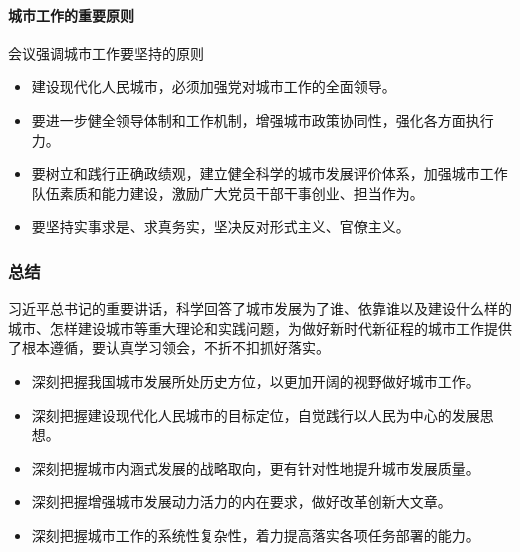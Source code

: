 \paragraph{城市工作的重要原则} 会议强调城市工作要坚持的原则

\begin{itemize}
    \item 建设现代化人民城市，必须加强党对城市工作的全面领导。
    \item 要进一步健全领导体制和工作机制，增强城市政策协同性，强化各方面执行力。
    \item 要树立和践行正确政绩观，建立健全科学的城市发展评价体系，加强城市工作队伍素质和能力建设，激励广大党员干部干事创业、担当作为。
    \item 要坚持实事求是、求真务实，坚决反对形式主义、官僚主义。
\end{itemize}

\subsubsection{总结}

习近平总书记的重要讲话，科学回答了城市发展为了谁、依靠谁以及建设什么样的城市、怎样建设城市等重大理论和实践问题，为做好新时代新征程的城市工作提供了根本遵循，要认真学习领会，不折不扣抓好落实。

\begin{itemize}
    \item 深刻把握我国城市发展所处历史方位，以更加开阔的视野做好城市工作。
    \item 深刻把握建设现代化人民城市的目标定位，自觉践行以人民为中心的发展思想。
    \item 深刻把握城市内涵式发展的战略取向，更有针对性地提升城市发展质量。
    \item 深刻把握增强城市发展动力活力的内在要求，做好改革创新大文章。
    \item 深刻把握城市工作的系统性复杂性，着力提高落实各项任务部署的能力。
\end{itemize}